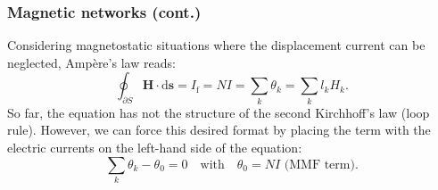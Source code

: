 \begin{frame}
	\frametitle{Magnetic networks (cont.)}
    Considering magnetostatic situations where the displacement current can be neglected, Amp\`ere's law reads:
    \begin{equation}
        \oint_{\partial S} \bm{H} \cdot \mathrm{d}\bm{s} = I_{\mathrm{f}} = N I = \sum_k  \theta_k = \sum_k l_k H_k.
        \label{eq:ampere_law_magnetic_network}
    \end{equation}
    \pause
    So far, the equation has not the structure of the second Kirchhoff’s law (loop rule). However, we can force this desired format by placing the term with the electric currents on the left-hand side of the equation:
    \begin{equation}
         \sum_k \theta_k - \theta_0 = 0 \quad \mbox{with} \quad \theta_0 = N I \,\,\mbox{(MMF term)}.
    \end{equation}
\end{frame}

